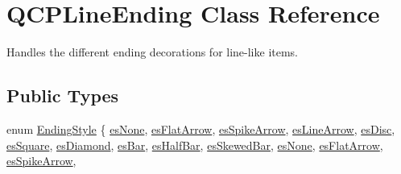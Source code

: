 \hypertarget{class_q_c_p_line_ending}{}\section{Q\+C\+P\+Line\+Ending Class Reference}
\label{class_q_c_p_line_ending}


Handles the different ending decorations for line-\/like items.  


\subsection*{Public Types}
\begin{DoxyCompactItemize}
\item 
enum \hyperlink{class_q_c_p_line_ending_a5ef16e6876b4b74959c7261d8d4c2cd5}{Ending\+Style} \{ \newline
\hyperlink{class_q_c_p_line_ending_a5ef16e6876b4b74959c7261d8d4c2cd5a4bb04638a925da992ec85609a014806e}{es\+None}, 
\hyperlink{class_q_c_p_line_ending_a5ef16e6876b4b74959c7261d8d4c2cd5ab029cfae46581afc53bb2a993450fe67}{es\+Flat\+Arrow}, 
\hyperlink{class_q_c_p_line_ending_a5ef16e6876b4b74959c7261d8d4c2cd5a814748a589d8bf2a0b6bf8ed4a6a5376}{es\+Spike\+Arrow}, 
\hyperlink{class_q_c_p_line_ending_a5ef16e6876b4b74959c7261d8d4c2cd5a74728a4c390e3756807c3537de728ff5}{es\+Line\+Arrow}, 
\newline
\hyperlink{class_q_c_p_line_ending_a5ef16e6876b4b74959c7261d8d4c2cd5a4e7a48003d59b1eed00767e879440600}{es\+Disc}, 
\hyperlink{class_q_c_p_line_ending_a5ef16e6876b4b74959c7261d8d4c2cd5a8b0298e645008220cbc6cef9d05eb950}{es\+Square}, 
\hyperlink{class_q_c_p_line_ending_a5ef16e6876b4b74959c7261d8d4c2cd5a0a9e21dfaf144c9b8ae41711f61199e3}{es\+Diamond}, 
\hyperlink{class_q_c_p_line_ending_a5ef16e6876b4b74959c7261d8d4c2cd5a1683a6a39898f53737ee21d4fedba791}{es\+Bar}, 
\newline
\hyperlink{class_q_c_p_line_ending_a5ef16e6876b4b74959c7261d8d4c2cd5a7b0b7402cc4bb17848d2a533a20c1e6f}{es\+Half\+Bar}, 
\hyperlink{class_q_c_p_line_ending_a5ef16e6876b4b74959c7261d8d4c2cd5a2d5490a55ff209f2443501a7f5328aab}{es\+Skewed\+Bar}, 
\hyperlink{class_q_c_p_line_ending_a5ef16e6876b4b74959c7261d8d4c2cd5a4bb04638a925da992ec85609a014806e}{es\+None}, 
\hyperlink{class_q_c_p_line_ending_a5ef16e6876b4b74959c7261d8d4c2cd5ab029cfae46581afc53bb2a993450fe67}{es\+Flat\+Arrow}, 
\newline
\hyperlink{class_q_c_p_line_ending_a5ef16e6876b4b74959c7261d8d4c2cd5a814748a589d8bf2a0b6bf8ed4a6a5376}{es\+Spike\+Arrow}, 

\end{DoxyCompactItemize}
